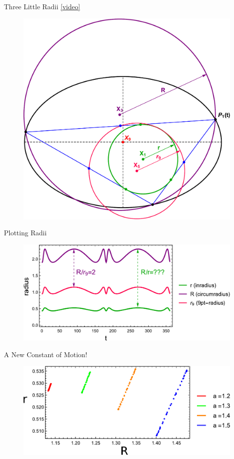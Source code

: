 \begin{frame}{Three Little Radii \href{https://youtu.be/kxiC19ZrOVA}{[video]}}
\begin{figure}
\includegraphics[width=.8\textheight]{pics/0070_Radii.pdf}
\end{figure}
\end{frame}

\begin{frame}{Plotting Radii}
\begin{figure}
\includegraphics[height=.7\textheight]{pics/0075_radii_plot.pdf}
\end{figure}
\end{frame}

\begin{frame}{A New Constant of Motion!}

\begin{figure}
\includegraphics[height=.5\textheight]{pics/0080_radii_scatter.pdf}
\end{figure}
\begin{center}
\end{center}
\end{frame}

